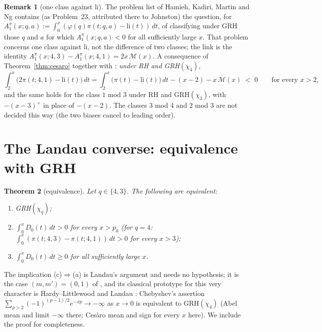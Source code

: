 \documentclass[11pt]{amsart}
\newtheorem{theorem}{Theorem}[section]
\theoremstyle{definition}
\newtheorem{remark}[theorem]{Remark}
\numberwithin{equation}{section}
\newcommand{\cM}{\mathcal M}          %
\begin{document}
\begin{remark}[one class against $\mathrm{li}$]\label{rem:oneclass}
The problem list of Hamieh, Kadiri, Martin and Ng \cite{HKMN24}
contains (as Problem~23, attributed there to Johnston) the question,
for $A_1^\pi(x;q,a):=\int_0^x(\varphi(q)\pi(t;q,a)-\mathrm{li}(t))\,dt$,
of classifying under GRH those $q$ and $a$ for which
$A_1^\pi(x;q,a)<0$ for all sufficiently large $x$. That problem
concerns one class against $\mathrm{li}$, not the difference of two
classes; the link is the identity
$A_1^\pi(x;4,3)-A_1^\pi(x;4,1)=2x\,\cM(x)$. A consequence of
Theorem~\ref{thm:cesaro} together with \cite[Theorem~1.1]{Joh23}:
\emph{under RH and GRH$(\chi_4)$},
\[
\int_2^x\bigl(2\pi(t;4,1)-\mathrm{li}(t)\bigr)\,dt
=\int_2^x\bigl(\pi(t)-\mathrm{li}(t)\bigr)\,dt-(x-2)-x\,\cM(x)\;<\;0
\qquad\text{for every }x>2,
\]
and the same holds for the class $1$ mod $3$ under RH and
GRH$(\chi_3)$, with $-(x-3)^+$ in place of $-(x-2)$. The classes
$3$ mod $4$ and $2$ mod $3$ are not decided this way (the two biases
cancel to leading order).
\end{remark}

\section{The Landau converse: equivalence with GRH}\label{sec:landau}

\begin{theorem}[equivalence]\label{thm:equiv}
Let $q\in\{4,3\}$. The following are equivalent:
\begin{enumerate}
\item[(a)] GRH$(\chi_q)$;
\item[(b)] $\int_0^xD_0(t)\,dt>0$ for every $x>p_0$ (for $q=4$:
$\int_0^x(\pi(t;4,3)-\pi(t;4,1))\,dt>0$ for every $x>3$);
\item[(c)] $\int_0^xD_0(t)\,dt\ge0$ for all sufficiently large $x$.
\end{enumerate}
\end{theorem}

The implication (c)$\Rightarrow$(a) is Landau's argument and needs no
hypothesis; it is the case $(m,m')=(0,1)$ of
\cite[the corollary ``equivalence with GRH for $q\in\{3,4\}$'', part~(a)]{MC}, and its classical prototype for this
very character is Hardy--Littlewood and Landau
\cite{HL18,Lan18}: Chebyshev's assertion
$\sum_{p>2}(-1)^{(p-1)/2}e^{-xp}\to-\infty$ as $x\to0$ is equivalent
to GRH$(\chi_4)$ (Abel mean and limit $-\infty$ there; Ces\`aro mean
and sign for every $x$ here). We include the proof for completeness.
\end{document}
